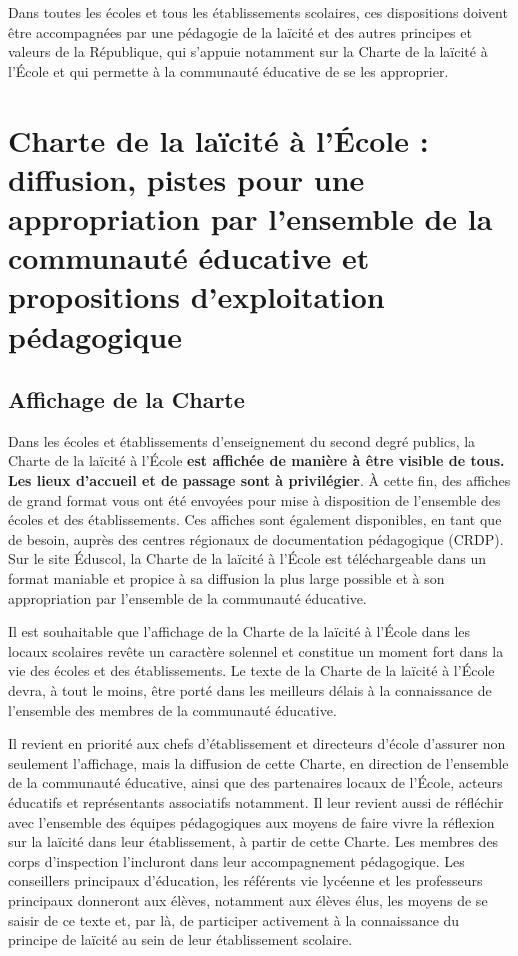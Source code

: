 Dans toutes les écoles et tous les établissements scolaires, ces dispositions doivent être accompagnées par une pédagogie de la laïcité et des autres principes et valeurs de la République, qui s’appuie notamment sur la Charte de la laïcité à l’École et qui permette à la communauté éducative de se les approprier.

\section{Charte de la laïcité à l’École : diffusion, pistes pour une appropriation par l’ensemble de la communauté éducative et propositions d’exploitation pédagogique}
\subsection{Affichage de la Charte}
Dans les écoles et établissements d’enseignement du second degré publics, la Charte de la laïcité à l’École \textbf{est affichée de manière à être visible de tous. Les lieux d’accueil et de passage sont à privilégier}. À cette fin, des affiches de grand format vous ont été envoyées pour mise à disposition de l’ensemble des écoles et des établissements. Ces affiches sont également disponibles, en tant que de besoin, auprès des centres régionaux de documentation pédagogique (CRDP). Sur le site Éduscol, la Charte de la laïcité à l’École est téléchargeable dans un format maniable et propice à sa diffusion la plus large possible et à son appropriation par l’ensemble de la communauté éducative.

Il est souhaitable que l’affichage de la Charte de la laïcité à l’École dans les locaux scolaires revête un caractère solennel et constitue un moment fort dans la vie des écoles et des établissements. Le texte de la Charte de la laïcité à l’École devra, à tout le moins, être porté dans les meilleurs délais à la connaissance de l’ensemble des membres de la communauté éducative.

Il revient en priorité aux chefs d’établissement et directeurs d’école d’assurer non seulement l’affichage, mais la diffusion de cette Charte, en direction de l’ensemble de la communauté éducative, ainsi que des partenaires locaux de l’École, acteurs éducatifs et représentants associatifs notamment. Il leur revient aussi de réfléchir avec l’ensemble des équipes pédagogiques aux moyens de faire vivre la réflexion sur la laïcité dans leur établissement, à partir de cette Charte. Les membres des corps d’inspection l’incluront dans leur accompagnement pédagogique. Les conseillers principaux d’éducation, les référents vie lycéenne et les professeurs principaux donneront aux élèves, notamment aux élèves élus, les moyens de se saisir de ce texte et, par là, de participer activement à la connaissance du principe de laïcité au sein de leur établissement scolaire.

